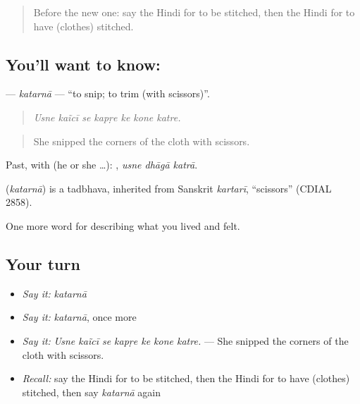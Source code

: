 \label{lesson:HI-C513-katarna}



\begin{quote}
Before the new one: say the Hindi for to be stitched, then the Hindi for to have (clothes) stitched.
\end{quote}

\subsection*{You'll want to know: }
\textbf{} — \emph{katarnā} — \textquotedblleft{}to snip; to trim (with scissors)\textquotedblright{}.

\begin{quote}
      
\end{quote}

\begin{quote}
\emph{Usne kaĩcī se kapṛe ke kone katre.}
\end{quote}

\begin{quote}
She snipped the corners of the cloth with scissors.
\end{quote}

Past, with  (he or she …):   , \emph{usne dhāgā katrā}.

\begin{cousinweb}
\textbf{} (\emph{katarnā}) is a tadbhava, inherited from Sanskrit \emph{kartarī}, \textquotedblleft{}scissors\textquotedblright{} (CDIAL 2858).
\end{cousinweb}

\begin{grammarlens}[title={What you've built}]
One more word for describing what you lived and felt.
\end{grammarlens}

\subsection*{Your turn}
\begin{itemize}
\raggedright
  \item \emph{Say it:} \emph{katarnā}
  \item \emph{Say it:} \emph{katarnā}, once more
  \item \emph{Say it:} \emph{Usne kaĩcī se kapṛe ke kone katre.} — She snipped the corners of the cloth with scissors.
  \item \emph{Recall:} say the Hindi for to be stitched, then the Hindi for to have (clothes) stitched, then say \emph{katarnā} again
\end{itemize}

